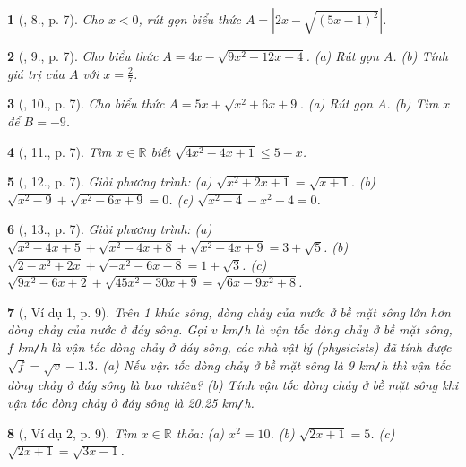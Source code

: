 \documentclass{article}
\newtheorem{baitoan}{}
\begin{document}
\begin{baitoan}[\cite{Tuyen_Toan_9_old}, 8., p. 7]
	Cho $x < 0$, rút gọn biểu thức $A = |2x - \sqrt{(5x - 1)^2}|$.
\end{baitoan}

\begin{baitoan}[\cite{Tuyen_Toan_9_old}, 9., p. 7]
	Cho biểu thức $A = 4x - \sqrt{9x^2 - 12x + 4}$. (a) Rút gọn $A$. (b) Tính giá trị của $A$ với $x = \frac{2}{7}$.
\end{baitoan}

\begin{baitoan}[\cite{Tuyen_Toan_9_old}, 10., p. 7]
	Cho biểu thức $A = 5x + \sqrt{x^2 + 6x + 9}$. (a) Rút gọn $A$. (b) Tìm $x$ để $B = -9$.
\end{baitoan}

\begin{baitoan}[\cite{Tuyen_Toan_9_old}, 11., p. 7]
	Tìm $x\in\mathbb{R}$ biết $\sqrt{4x^2 - 4x + 1}\le5 - x$.
\end{baitoan}

\begin{baitoan}[\cite{Tuyen_Toan_9_old}, 12., p. 7]
	Giải phương trình: (a) $\sqrt{x^2 + 2x + 1} = \sqrt{x + 1}$. (b) $\sqrt{x^2 - 9} + \sqrt{x^2 - 6x + 9} = 0$. (c) $\sqrt{x^2 - 4} - x^2 + 4 = 0$.
\end{baitoan}

\begin{baitoan}[\cite{Tuyen_Toan_9_old}, 13., p. 7]
	Giải phương trình: (a) $\sqrt{x^2 - 4x + 5} + \sqrt{x^2 - 4x + 8} + \sqrt{x^2 - 4x + 9} = 3 + \sqrt{5}$. (b) $\sqrt{2 - x^2 + 2x} + \sqrt{-x^2 - 6x - 8} = 1 + \sqrt{3}$. (c) $\sqrt{9x^2 - 6x + 2} + \sqrt{45x^2 - 30x + 9} = \sqrt{6x - 9x^2 + 8}$. 
\end{baitoan}

\begin{baitoan}[\cite{Binh_boi_duong_Toan_9_tap_1}, Ví dụ 1, p. 9]
	Trên 1 khúc sông, dòng chảy của nước ở bề mặt sông lớn hơn dòng chảy của nước ở đáy sông. Gọi $v$ {\rm km{\tt/}h} là vận tốc dòng chảy ở bề mặt sông, $f$ {\rm km{\tt/}h} là vận tốc dòng chảy ở đáy sông, các nhà vật lý (physicists) đã tính được $\sqrt{f} = \sqrt{v} - 1.3$. (a) Nếu vận tốc dòng chảy ở bề mặt sông là {\rm9 km{\tt/}h} thì vận tốc dòng chảy ở đáy sông là bao nhiêu? (b) Tính vận tốc dòng chảy ở bề mặt sông khi vận tốc dòng chảy ở đáy sông là {\rm20.25 km{\tt/}h}.
\end{baitoan}

\begin{baitoan}[\cite{Binh_boi_duong_Toan_9_tap_1}, Ví dụ 2, p. 9]
	Tìm $x\in\mathbb{R}$ thỏa: (a) $x^2 = 10$. (b) $\sqrt{2x + 1} = 5$. (c) $\sqrt{2x + 1} = \sqrt{3x - 1}$.
\end{baitoan}
\end{document}
